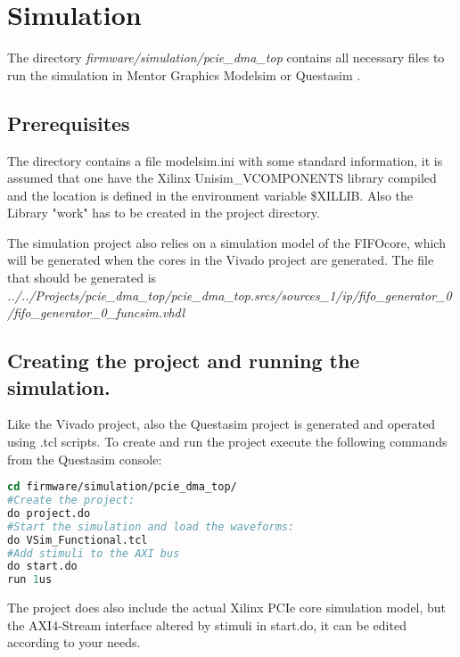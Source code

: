 \section{Simulation}
The directory \textit{firmware/simulation/pcie\_dma\_top} contains all necessary files to run the simulation in Mentor Graphics Modelsim or Questasim \cite{questasim}. 

\subsection{Prerequisites}
The directory contains a file modelsim.ini with some standard information, it is assumed that one have the Xilinx Unisim\_VCOMPONENTS library compiled and the location is defined in the environment variable \$XILLIB. Also the Library "work" has to be created in the project directory.

The simulation project also relies on a simulation model of the FIFOcore, which will be generated when the cores in the Vivado project are generated. The file that should be generated is \textit{../../Projects/pcie\_dma\_top/pcie\_dma\_top.srcs/sources\_1/ip/fifo\_generator\_0 /fifo\_generator\_0\_funcsim.vhdl}

\subsection{Creating the project and running the simulation.}
Like the Vivado project, also the Questasim project is generated and operated using .tcl scripts. To create and run the project execute the following commands from the Questasim console:
\begin{lstlisting}[language=tcl, frame=single, caption=Run the simulation]
cd firmware/simulation/pcie_dma_top/
#Create the project:
do project.do
#Start the simulation and load the waveforms:
do VSim_Functional.tcl
#Add stimuli to the AXI bus
do start.do
run 1us
\end{lstlisting}
The project does also include the actual Xilinx PCIe core simulation model, but the AXI4-Stream interface altered by stimuli in start.do, it can be edited according to your needs.
\newpage